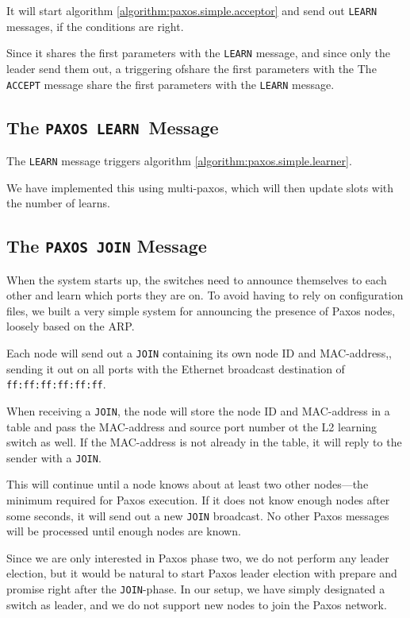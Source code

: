 It will start algorithm \ref{algorithm:paxos.simple.acceptor} and send out
\texttt{LEARN} messages, if the conditions are right.

Since it shares the first parameters with the \texttt{LEARN} message, and
since only the leader send them out, a triggering ofshare the first parameters with the 
The \texttt{ACCEPT} message share the first parameters with the
\texttt{LEARN} message.
%


\subsection{The \texttt{PAXOS LEARN} Message}
\label{chapter:paxos.learn.message}

The \texttt{LEARN} message triggers algorithm
\vref{algorithm:paxos.simple.learner}.

We have implemented this using multi-paxos, which will then update slots
with the number of learns.

\subsection{The \texttt{PAXOS JOIN} Message}
\label{chapter:paxos.join.message}

When the system starts up, the switches need to announce themselves to each
other and learn which ports they are on.
%
To avoid having to rely on configuration files, we built a very simple
system for announcing the presence of Paxos nodes, loosely based on the
\acf{ARP}.

Each node will send out a \texttt{JOIN} containing its own node ID and
MAC-address,, sending it out on all ports with the Ethernet broadcast
destination of \texttt{ff:ff:ff:ff:ff:ff}.

When receiving a \texttt{JOIN}, the node will store the node ID and
MAC-address in a table and pass the MAC-address and source port number ot
the L2 learning switch as well.
%
If the MAC-address is not already in the table, it will reply to the sender
with a \texttt{JOIN}.

This will continue until a node knows about at least two other nodes---the
minimum required for Paxos execution.
%
If it does not know enough nodes after some seconds, it will send out a new
\texttt{JOIN} broadcast.
%
No other Paxos messages will be processed until enough nodes are known.

Since we are only interested in Paxos phase two, we do not perform any
leader election, but it would be natural to start Paxos leader election with
prepare and promise right after the \texttt{JOIN}-phase.
%
In our setup, we have simply designated a switch as leader, and we do not
support new nodes to join the Paxos network.


